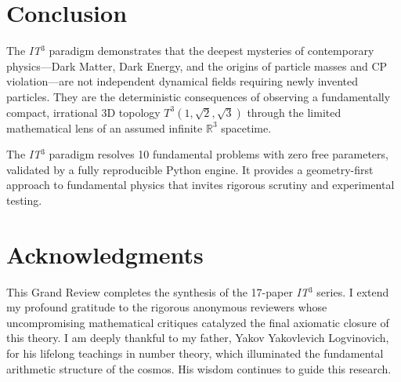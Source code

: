 \documentclass[12pt, a4paper]{article}
\newcommand{\ITthree}{\textit{IT}\ensuremath{^3}}
\newcommand{\Tthree}{\ensuremath{T^3(1,\sqrt{2},\sqrt{3})}}
\begin{document}
\section{Conclusion}
\label{sec:conclusion}

The \ITthree{} paradigm demonstrates that the deepest mysteries of contemporary physics---Dark Matter, Dark Energy, and the origins of particle masses and CP violation---are not independent dynamical fields requiring newly invented particles. They are the deterministic consequences of observing a fundamentally compact, irrational 3D topology \Tthree{} through the limited mathematical lens of an assumed infinite $\mathbb{R}^3$ spacetime.

The \ITthree{} paradigm resolves 10 fundamental problems with zero free parameters, validated by a fully reproducible Python engine. It provides a geometry-first approach to fundamental physics that invites rigorous scrutiny and experimental testing.

\section*{Acknowledgments}
This Grand Review completes the synthesis of the 17-paper \ITthree{} series. I extend my profound gratitude to the rigorous anonymous reviewers whose uncompromising mathematical critiques catalyzed the final axiomatic closure of this theory. I am deeply thankful to my father, Yakov Yakovlevich Logvinovich, for his lifelong teachings in number theory, which illuminated the fundamental arithmetic structure of the cosmos. His wisdom continues to guide this research.
\end{document}
